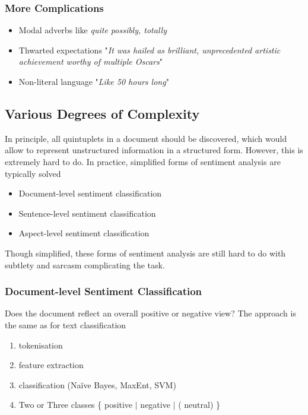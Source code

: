 \documentclass[11pt]{article}
\begin{document}
\subsubsection{More Complications}
\begin{itemize}
	\item Modal adverbs like \emph{quite possibly, totally}
	\item Thwarted expectations "\emph{It was hailed as brilliant, unprecedented artistic achievement worthy of multiple Oscars}"
	\item Non-literal language "\emph{Like 50 hours long}"
\end{itemize}

\subsection{Various Degrees of Complexity}
In principle, all quintuplets in a document should be discovered, which would allow to represent unstructured information in a structured form. However, this is extremely hard to do. In practice, simplified forms of sentiment analysis are typically solved
\begin{itemize}
	\item Document-level sentiment classification
	\item Sentence-level sentiment classification
	\item Aspect-level sentiment classification
\end{itemize}
Though simplified, these forms of sentiment analysis are still hard to do with subtlety and sarcasm complicating the task.

\subsubsection{Document-level Sentiment Classification}
Does the document reflect an overall {\color{Green3} positive} or {\color{Firebrick3} negative} view? The approach is the same as for text classification
\begin{enumerate}
	\item tokenisation
	\item feature extraction
	\item classification (Naïve Bayes, MaxEnt, SVM)
	\item Two or Three classes \{ {\color{Green3} positive} $\vert$ {\color{Firebrick3} negative} $\vert$ ({\color{gray} neutral}) \}
\end{enumerate}
\end{document}
